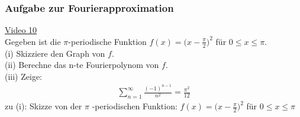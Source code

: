 \subsubsection{Aufgabe zur Fourierapproximation }
\href{https://youtu.be/USTvFINpj6I}{Video 10}\\
Gegeben ist die $\pi$-periodische Funktion $ f(x)=\big(x-\frac{\pi}{2}\big)^2 $ für $ 0\leq x \leq\pi $.\\
(i) \;\;Skizziere den Graph von $ f $.\\
(ii)\; Berechne das n-te Fourierpolynom von $ f $.\\
(iii) Zeige:\\
\begin{align*}
\sum\limits_{n=1}^{\infty}\frac{(-1)^{n-1}}{n^2}=\frac{\pi^2}{12}
\end{align*}
zu (i): Skizze von der $\pi$ -periodischen Funktion: $ f(x)=\big(x-\frac{\pi}{2}\big)^2$ für $ 0\leq x \leq\pi $\\
